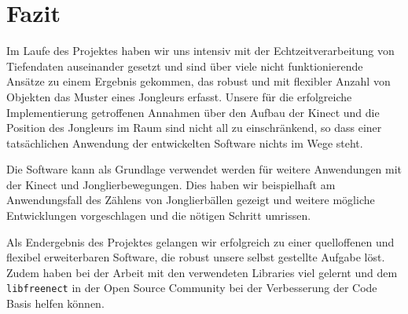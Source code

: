 \documentclass[12pt,a4paper,ngerman]{scrartcl}
\begin{document}
\section{Fazit}

Im Laufe des Projektes haben wir uns intensiv mit der Echtzeitverarbeitung von
Tiefendaten auseinander gesetzt und sind über viele nicht funktionierende
Ansätze zu einem Ergebnis gekommen, das robust und mit flexibler Anzahl von
Objekten das Muster eines Jongleurs erfasst. Unsere für die erfolgreiche
Implementierung getroffenen Annahmen über den Aufbau der Kinect und die Position des
Jongleurs im Raum sind nicht all zu einschränkend, so dass einer tatsächlichen
Anwendung der entwickelten Software nichts im Wege steht.

Die Software kann als Grundlage verwendet werden für weitere Anwendungen mit
der Kinect und Jonglierbewegungen. Dies haben wir beispielhaft am Anwendungsfall
des Zählens von Jonglierbällen gezeigt und weitere mögliche Entwicklungen
vorgeschlagen und die nötigen Schritt umrissen.

Als Endergebnis des Projektes gelangen wir erfolgreich zu einer quelloffenen und flexibel
erweiterbaren Software, die robust unsere selbst gestellte Aufgabe löst. Zudem haben
bei der Arbeit mit den verwendeten Libraries viel gelernt und dem
\lstinline{libfreenect} in der Open Source Community bei der Verbesserung der
Code Basis helfen können.




\newpage
\end{document}
